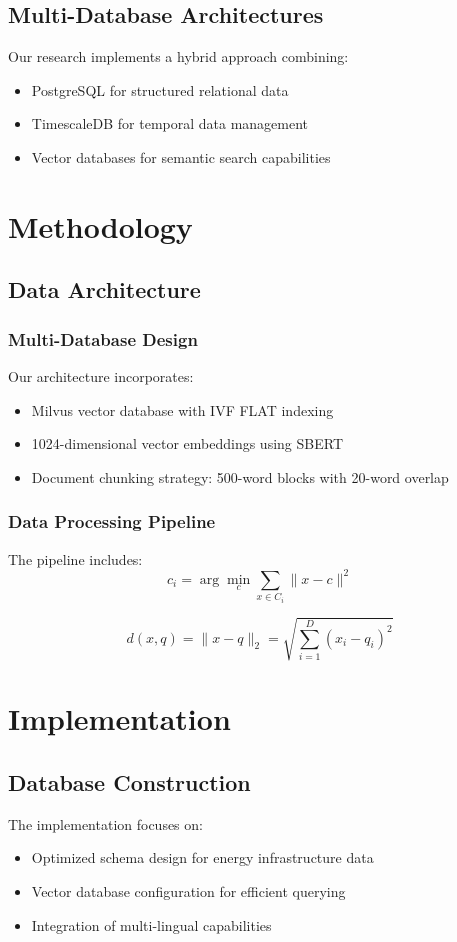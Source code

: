 \documentclass[conference]{IEEEtran}
\begin{document}
\subsection{Multi-Database Architectures}
Our research implements a hybrid approach combining:
\begin{itemize}
\item PostgreSQL for structured relational data
\item TimescaleDB for temporal data management
\item Vector databases for semantic search capabilities
\end{itemize}

\section{Methodology}
\subsection{Data Architecture}
\subsubsection{Multi-Database Design}
Our architecture incorporates:
\begin{itemize}
\item Milvus vector database with IVF FLAT indexing
\item 1024-dimensional vector embeddings using SBERT
\item Document chunking strategy: 500-word blocks with 20-word overlap
\end{itemize}

\subsubsection{Data Processing Pipeline}
The pipeline includes:
\begin{equation}
c_i = \arg\min_c \sum_{x\in C_i} \|x - c\|^2
\end{equation}

\begin{equation}
d(x, q) = \|x - q\|_2 = \sqrt{\sum_{i=1}^D (x_i - q_i)^2}
\end{equation}

\section{Implementation}
\subsection{Database Construction}
The implementation focuses on:
\begin{itemize}
\item Optimized schema design for energy infrastructure data
\item Vector database configuration for efficient querying
\item Integration of multi-lingual capabilities
\end{itemize}
\end{document}
